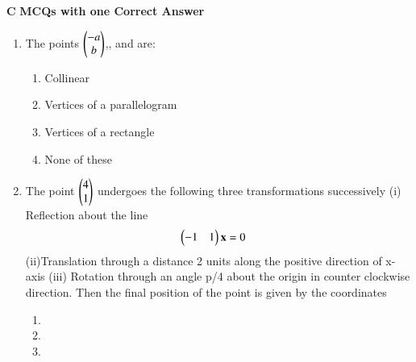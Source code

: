 {\large \textbf{C} \textbf{MCQs with one Correct Answer}}
\begin{enumerate}
    \item The points $\begin{pmatrix}-a\\b\end{pmatrix}$,, and  are:
    \begin{enumerate}
    \item  Collinear
    \item  Vertices of a parallelogram
    \item  Vertices of a rectangle
    \item  None of these
    \end{enumerate}
    \item The point $\begin{pmatrix}4 \\ 1\end{pmatrix}$ undergoes the following three transformations successively
    (i) Reflection about the line \begin{align} 
    \begin{pmatrix}-1 & 1\end{pmatrix}\mathbf{x} &= 0
    \end{align}
    (ii)Translation through a distance 2 units along the positive direction of x-axis
    (iii) Rotation through an angle p/4 about the origin in counter clockwise direction.
    Then the final position of the point is given by the coordinates
    \begin{enumerate}
     \item  {}
    
     \item  {}
    
     \item  {}
    

\end{enumerate}
\end{enumerate}
